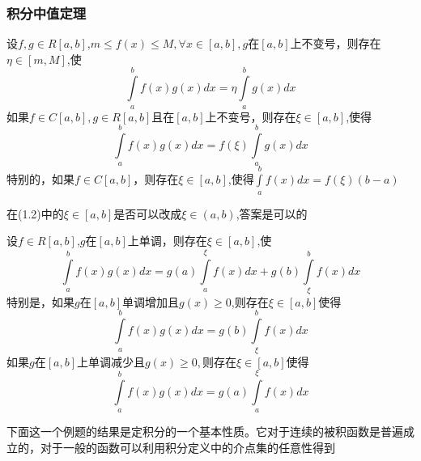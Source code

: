 \documentclass[lang=cn,10pt]{elegantbook}
\begin{document}
\subsubsection{积分中值定理}
\begin{proposition}[积分第一中值定理]
	设$f,g\in R[a,b]$,$m\le f(x)\le M,\forall x \in [a,b] ,g $在$[a,b]$上不变号，则存在$\eta \in [m,M]$,使
	\begin{equation}
		\int\limits_a^b{f\left( x \right) g\left( x \right) dx=\eta}\int\limits_a^b{g\left( x \right) dx}
	\end{equation}
	如果$f\in C[a,b],g\in R[a,b]$且在$[a,b]$上不变号，则存在$\xi\in [a,b]$,使得
	\begin{equation}
		\int\limits_a^b{f\left( x \right) g\left( x \right) dx=f(\xi)}\int\limits_a^b{g\left( x \right) dx}
	\end{equation}	
	特别的，如果$f\in C[a,b]$，则存在$\xi\in [a,b]$,使得$\int\limits_a^b{f\left( x \right) dx=}f\left( \xi \right) \left( b-a \right)$
\end{proposition}
\begin{remark}
	在(1.2)中的$\xi\in [a,b]$是否可以改成$\xi\in (a,b)$,答案是可以的
\end{remark}
\begin{proposition}[积分第二中值定理]
	设$f\in R[a,b]$,$g$在$[a,b]$上单调，则存在$\xi\in [a,b]$,使
	\begin{equation*}
		\int\limits_a^b{f\left( x \right) g\left( x \right) dx=}g\left( a \right) \int\limits_a^{\xi}{f\left( x \right) dx}+g\left( b \right) \int\limits_{\xi}^b{f\left( x \right) dx}
	\end{equation*}
特别是，如果$g$在$[a,b]$单调增加且$g(x)\ge 0$,则存在$\xi \in [a,b]$使得
\begin{equation*}
	\int\limits_a^b{f\left( x \right) g\left( x \right) dx=}g\left( b \right) \int\limits_{\xi}^b{f\left( x \right) dx}
\end{equation*}
如果$g$在$[a,b]$上单调减少且$g(x)\ge 0,$则存在$\xi \in [a,b]$使得
\begin{equation*}
	\int\limits_a^b{f\left( x \right) g\left( x \right) dx=}g\left( a \right) \int\limits_a^{\xi}{f\left( x \right) dx}
\end{equation*}
\end{proposition}

下面这一个例题的结果是定积分的一个基本性质。它对于连续的被积函数是普遍成立的，对于一般的函数可以利用积分定义中的介点集的任意性得到
\end{document}
